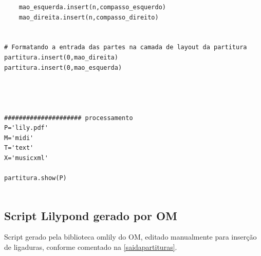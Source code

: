 \documentclass[
	12pt,				%
	openright,			%
	twoside,			%
	a4paper,			%
	english,			%
	french,				%
	spanish,			%
	brazil				%
	]{abntex2}
\begin{document}
\begin{lstlisting}
	mao_esquerda.insert(n,compasso_esquerdo)
	mao_direita.insert(n,compasso_direito)


# Formatando a entrada das partes na camada de layout da partitura
partitura.insert(0,mao_direita)
partitura.insert(0,mao_esquerda)




##################### processamento
P='lily.pdf'
M='midi'
T='text'
X='musicxml'

partitura.show(P)


\end{lstlisting}


\subsection{Script Lilypond gerado por OM}

Script gerado pela biblioteca omlily do OM, editado manualmente para inserção de ligaduras, conforme comentado na \autoref{saidapartituras}.
\end{document}
